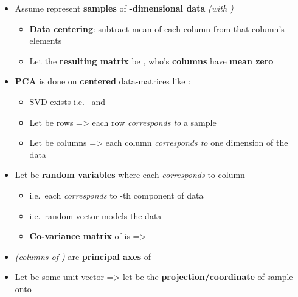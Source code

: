 \begin{itemize}

\item
  Assume 
  represent \textbf{ samples} of \textbf{-dimensional
  data} \emph{(with )}

  \begin{itemize}
  
  \item
    \textbf{Data centering}: subtract mean of each column from that
    column's elements
  \item
    Let the \textbf{resulting matrix} be
    , who's \textbf{columns} have
    \textbf{mean zero}
  \end{itemize}
\item
  \textbf{PCA} is done on \textbf{centered} data-matrices like
  :

  \begin{itemize}
  
  \item
    SVD exists i.e.~ and 
  \item
    Let  be rows
    =\textgreater{} each row \emph{corresponds to} a sample
  \item
    Let  be columns
    =\textgreater{} each column \emph{corresponds to} one dimension of
    the data
  \end{itemize}
\item
  Let  be \textbf{random variables} where
  each  \emph{corresponds} to column 

  \begin{itemize}
  
  \item
    i.e.~each  \emph{corresponds} to -th component
    of data
  \item
    i.e.~random vector  models the
    data 
  \item
    \textbf{Co-variance matrix} of  is
     =\textgreater{}
  \end{itemize}
\item
   \emph{(columns of
  )} are \textbf{principal axes} of 
\item
  Let  be some unit-vector
  =\textgreater{} let
   be the
  \textbf{projection/coordinate} of sample  onto


\end{itemize}
